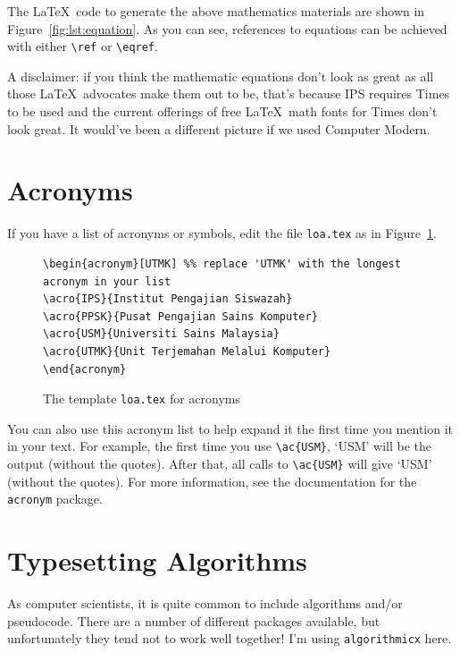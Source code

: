 The \LaTeX\ code to generate the above mathematics materials are shown in Figure~\ref{fig:lst:equation}.  As you can see, references to equations can be achieved with either \verb|\ref| or \verb|\eqref|. 

A disclaimer: if you think the mathematic equations don't look as great as all those \LaTeX\ advocates make them out to be, that's because IPS requires Times to be used and the current offerings of free \LaTeX\ math fonts for Times don't look great. It would've been a different picture if we used Computer Modern.

\section{Acronyms}
\acresetall
If you have a list of acronyms or symbols, edit the file \verb|loa.tex| as in Figure~\ref{fig:acronym}.

\begin{figure}[hbt!]
\begin{lstlisting}
\begin{acronym}[UTMK] %% replace 'UTMK' with the longest acronym in your list
\acro{IPS}{Institut Pengajian Siswazah}
\acro{PPSK}{Pusat Pengajian Sains Komputer}
\acro{USM}{Universiti Sains Malaysia}
\acro{UTMK}{Unit Terjemahan Melalui Komputer}
\end{acronym}
\end{lstlisting}
\caption{The template \texttt{loa.tex} for acronyms}\label{fig:acronym}
\end{figure}

You can also use this acronym list to help expand it the first time you mention it in your text.  For example, the first time you use \verb|\ac{USM}|, `\ac{USM}' will be the output (without the quotes).  After that, all calls to \verb|\ac{USM}| will give `\ac{USM}' (without the quotes).  For more information, see the documentation for the \texttt{acronym} package.


\section{Typesetting Algorithms}

As computer scientists, it is quite common to include algorithms and/or pseudocode. There are a number of different packages available, but unfortunately they tend not to work well together! I'm using \texttt{algorithmicx} here.

